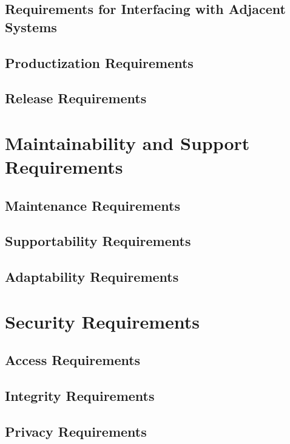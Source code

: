 \documentclass{scrreprt}
\begin{document}
\subsection{Requirements for Interfacing with Adjacent Systems}

\subsection{Productization Requirements}

\subsection{Release Requirements}

\section{Maintainability and Support Requirements}

\subsection{Maintenance Requirements}

\subsection{Supportability Requirements}

\subsection{Adaptability Requirements}

\section{Security Requirements}

\subsection{Access Requirements}

\subsection{Integrity Requirements}

\subsection{Privacy Requirements}
\end{document}
